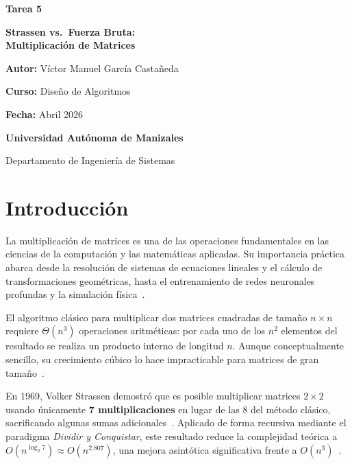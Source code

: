 \documentclass[12pt,a4paper]{article}
\begin{document}
\begin{titlepage}
    \centering
    \vspace*{3cm}
    {\Huge \textbf{Tarea 5}\par}
    \vspace{1cm}
    {\LARGE \textbf{Strassen vs.\ Fuerza Bruta:\\[8pt]
    Multiplicaci\'on de Matrices}\par}
    \vspace{2.5cm}
    {\Large \textbf{Autor:} V\'ictor Manuel Garc\'ia Casta\~neda\par}
    \vspace{0.8cm}
    {\large \textbf{Curso:} Dise\~no de Algoritmos\par}
    \vspace{0.8cm}
    {\large \textbf{Fecha:} Abril 2026\par}
    \vfill
    {\Large \textbf{Universidad Aut\'onoma de Manizales}\par}
    \vspace{0.3cm}
    {\large Departamento de Ingenier\'ia de Sistemas\par}
    \vspace{1cm}
\end{titlepage}

\tableofcontents
\newpage

\section{Introducci\'on}

La multiplicaci\'on de matrices es una de las operaciones fundamentales en las
ciencias de la computaci\'on y las matem\'aticas aplicadas. Su importancia
pr\'actica abarca desde la resoluci\'on de sistemas de ecuaciones lineales y el
c\'alculo de transformaciones geom\'etricas, hasta el entrenamiento de redes
neuronales profundas y la simulaci\'on f\'isica~\cite{cormen2009introduction}.

El algoritmo cl\'asico para multiplicar dos matrices cuadradas de tama\~no
$n \times n$ requiere $\Theta(n^3)$ operaciones aritm\'eticas: por cada uno de
los $n^2$ elementos del resultado se realiza un producto interno de longitud
$n$. Aunque conceptualmente sencillo, su crecimiento c\'ubico lo hace
impracticable para matrices de gran tama\~no~\cite{golub2013matrix}.

En 1969, Volker Strassen demostr\'o que es posible multiplicar matrices
$2 \times 2$ usando \'unicamente \textbf{7 multiplicaciones} en lugar de las 8
del m\'etodo cl\'asico, sacrificando algunas sumas
adicionales~\cite{strassen1969gaussian}. Aplicado de forma recursiva mediante el
paradigma \emph{Dividir y Conquistar}, este resultado reduce la complejidad
te\'orica a $O(n^{\log_2 7}) \approx O(n^{2{.}807})$, una mejora asint\'otica
significativa frente a $O(n^3)$~\cite{cormen2009introduction}.
\end{document}

